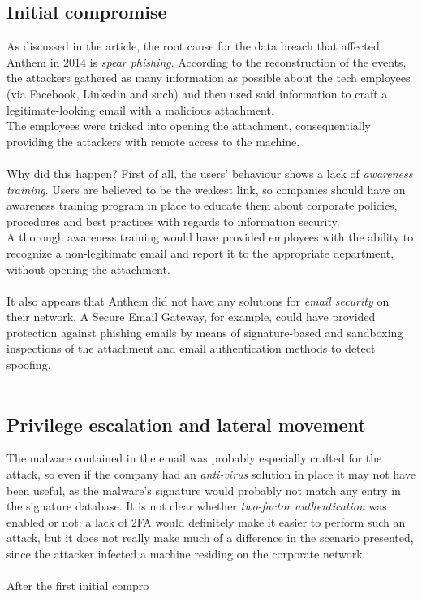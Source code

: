 \documentclass[a4paper]{article}
\begin{document}
	\subsection{Initial compromise}
	As discussed in the article, the root cause for the data breach that affected Anthem in 2014 is \textit{spear phishing}. According to the reconstruction of the events, the attackers gathered as many information as possible about the tech employees (via Facebook, Linkedin and such) and then used said information to craft a legitimate-looking email with a malicious attachment. \\
	The employees were tricked into opening the attachment, consequentially providing the attackers with remote access to the machine.\\\\
	Why did this happen? First of all, the users' behaviour shows a lack of \textit{awareness training}. Users are believed to be the weakest link, so companies should have an awareness training program in place to educate them about corporate policies, procedures and best practices with regards to information security.\\
	A thorough awareness training would have provided employees with the ability to recognize a non-legitimate email and report it to the appropriate department, without opening the attachment.\\\\
	It also appears that Anthem did not have any solutions for \textit{email security} on their network. A Secure Email Gateway, for example, could have provided protection against phishing emails by means of signature-based and sandboxing inspections of the attachment and email authentication methods to detect spoofing.\\\\
	\subsection{Privilege escalation and lateral movement}
	The malware contained in the email was probably especially crafted for the attack, so even if the company had an \textit{anti-virus} solution in place it may not have been useful, as the malware's signature would probably not match any entry in the signature database. It is not clear whether \textit{two-factor authentication} was enabled or not: a lack of 2FA would definitely make it easier to perform such an attack, but it does not really make much of a difference in the scenario presented, since the attacker infected a machine residing on the corporate network.\\\\
	After the first initial compro
	
\end{document}
